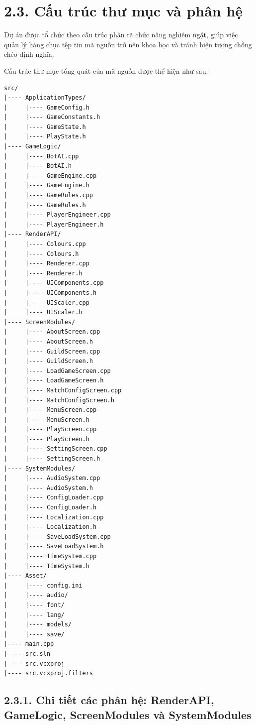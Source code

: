 \section*{2.3. Cấu trúc thư mục và phân hệ}

\noindent \indent Dự án được tổ chức theo cấu trúc phân rã chức năng nghiêm ngặt, giúp việc quản lý hàng chục tệp tin mã nguồn trở nên khoa học và tránh hiện tượng chồng chéo định nghĩa.

\noindent \indent Cấu trúc thư mục tổng quát của mã nguồn được thể hiện như sau:

{\small
\begin{verbatim}
src/
|---- ApplicationTypes/
|     |---- GameConfig.h
|     |---- GameConstants.h
|     |---- GameState.h
|     |---- PlayState.h
|---- GameLogic/
|     |---- BotAI.cpp
|     |---- BotAI.h
|     |---- GameEngine.cpp
|     |---- GameEngine.h
|     |---- GameRules.cpp
|     |---- GameRules.h
|     |---- PlayerEngineer.cpp
|     |---- PlayerEngineer.h
|---- RenderAPI/
|     |---- Colours.cpp
|     |---- Colours.h
|     |---- Renderer.cpp
|     |---- Renderer.h
|     |---- UIComponents.cpp
|     |---- UIComponents.h
|     |---- UIScaler.cpp
|     |---- UIScaler.h
|---- ScreenModules/
|     |---- AboutScreen.cpp
|     |---- AboutScreen.h
|     |---- GuildScreen.cpp
|     |---- GuildScreen.h
|     |---- LoadGameScreen.cpp
|     |---- LoadGameScreen.h
|     |---- MatchConfigScreen.cpp
|     |---- MatchConfigScreen.h
|     |---- MenuScreen.cpp
|     |---- MenuScreen.h
|     |---- PlayScreen.cpp
|     |---- PlayScreen.h
|     |---- SettingScreen.cpp
|     |---- SettingScreen.h
|---- SystemModules/
|     |---- AudioSystem.cpp
|     |---- AudioSystem.h
|     |---- ConfigLoader.cpp
|     |---- ConfigLoader.h
|     |---- Localization.cpp
|     |---- Localization.h
|     |---- SaveLoadSystem.cpp
|     |---- SaveLoadSystem.h
|     |---- TimeSystem.cpp
|     |---- TimeSystem.h
|---- Asset/
|     |---- config.ini
|     |---- audio/
|     |---- font/
|     |---- lang/
|     |---- models/
|     |---- save/
|---- main.cpp
|---- src.sln
|---- src.vcxproj
|---- src.vcxproj.filters
\end{verbatim}
}

\subsection*{2.3.1. Chi tiết các phân hệ: RenderAPI, GameLogic, ScreenModules và SystemModules}

